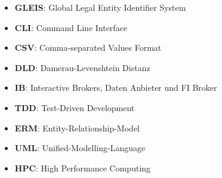 \begin{itemize}
	\item \textbf{GLEIS}: Global Legal Entity Identifier System
    \item \textbf{CLI}: Command Line Interface
    \item \textbf{CSV}: Comma-separated Values Format
    \item \textbf{DLD}: Damerau-Levenshtein Distanz
    \item \textbf{IB}: Interactive Brokers, Daten Anbieter und FI Broker
    \item \textbf{TDD}: Test-Driven Development
    \item \textbf{ERM}: Entity-Relationship-Model
    \item \textbf{UML}: Unified-Modelling-Language
    \item \textbf{HPC}: High Performance Computing
\end{itemize}